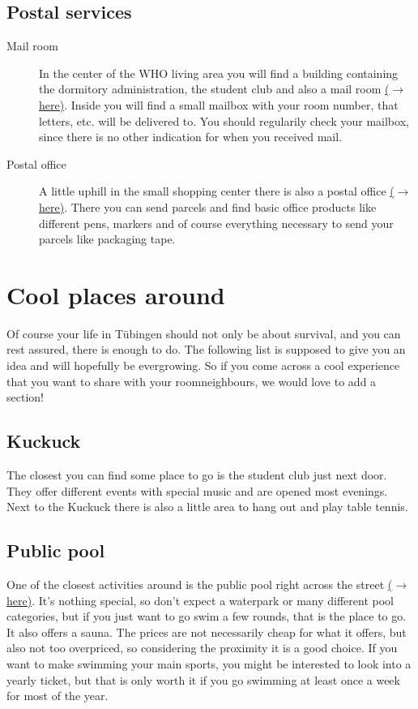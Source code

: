 \subsection{Postal services}
\begin{description}
    \item[Mail room]
    In the center of the WHO living area you will find a building containing the dormitory administration, the student club  and also a mail room \href{https://maps.app.goo.gl/W9UtqfhE1LJJ5oGH8}{($\xrightarrow{}$ here)}. Inside you will find a small mailbox with your room number, that letters, etc. will be delivered to. You should regularily check your mailbox, since there is no other indication for when you received mail.

    \item[Postal office]
    A little uphill in the small  shopping center there is also a postal office \href{https://maps.app.goo.gl/nMnEheHexNQ5NZY37}{($\xrightarrow{}$ here)}. There you can send parcels and find basic office products like different pens, markers and of course everything necessary to send your parcels like packaging tape.
\end{description}

\section{Cool places around}
Of course your life in Tübingen should not only be about survival, and you can rest assured, there is enough to do. The following list is supposed to give you an idea and will hopefully be evergrowing. So if you come across a cool experience that you want to share with your roomneighbours, we would love to add a section!

\subsection{Kuckuck}
The closest you can find some place to go is the student club  just next door. They offer different events with special music and are opened most evenings. Next to the Kuckuck there is also a little area to hang out and play table tennis.

\subsection{Public pool}
One of the closest activities around is the public pool right across the street \href{https://maps.app.goo.gl/NZaCajzPTgFjabqH6}{($\xrightarrow{}$ here)}. It's nothing special, so don't expect a waterpark or many different pool categories, but if you just want to go swim a few rounds, that is the place to go. It also offers a sauna. The prices are not necessarily cheap for what it offers, but also not too overpriced, so considering the proximity it is a good choice. If you want to make swimming your main sports, you might be interested to look into a yearly ticket, but that is only worth it if you go swimming at least once a week for most of the year.

